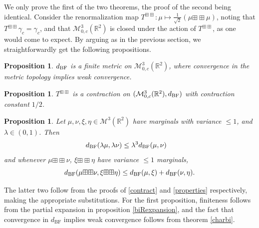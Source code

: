 \documentclass{amsart}
\newtheorem{proposition}[theorem]{Proposition}
\theoremstyle{definition}
\theoremstyle{remark}
\numberwithin{equation}{section}
\begin{document}
We only prove the first of the two theorems, the proof of the second being identical. Consider the renormalization map $T^{{\boxplus\boxplus}}:\mu\mapsto \frac{1}{\sqrt{2}}(\mu{\boxplus\boxplus}\mu)$, noting that $T^{{\boxplus\boxplus}}\gamma_c = \gamma_c$, and that $\mathcal{M}_{0,c}^3(\mathbb{R}^2)$ is closed under the action of $T^{{\boxplus\boxplus}}$, as one would come to expect. By arguing as in the previous section, we straightforwardly get the following propositions.
\begin{proposition}
    $d_{\text{\normalfont{BF}}}$ is a finite metric on $\mathcal{M}_{0,c}^3(\mathbb{R}^2)$, where convergence in the metric topology implies weak convergence.
\end{proposition}
\begin{proposition}
    $T^{{\boxplus\boxplus}}$ is a contraction on $(\mathcal{M}_{0,c}^3(\mathbb{R}^2), d_{\text{\normalfont{BF}}})$ with contraction constant $1/2$.
\end{proposition}
\begin{proposition}\label{propertiesBF}
    Let $\mu, \nu, \xi, \eta \in \mathcal{M}^3(\mathbb{R}^2)$ have marginals with variance $\leq 1$, and $\lambda \in (0,1)$. Then 
    \begin{align*}
        d_{\text{\normalfont BF}}(\lambda \mu,\lambda \nu)&\leq \lambda^3d_{\text{\normalfont BF}}( \mu, \nu)
    \end{align*}
    and whenever $\mu {\boxplus\boxplus}\nu$, $\xi{\boxplus\boxplus}\eta$ have variance $\leq 1$ marginals,
    \[
         d_{\text{\normalfont BF}}(\mu {\boxplus\boxplus}\nu, \xi{\boxplus\boxplus}\eta) \leq d_{\text{\normalfont BF}}(\mu, \xi)+d_{\text{\normalfont BF}}(\nu,\eta).
    \]
\end{proposition}
The latter two follow from the proofs of \ref{contract} and \ref{properties} respectively, making the appropriate substitutions. For the first proposition, finiteness follows from the partial expansion in proposition \ref{biRexpansion}, and the fact that convergence in $d_{\mathrm{BF}}$ implies weak convergence follows from theorem \ref{charbi}.
\end{document}
